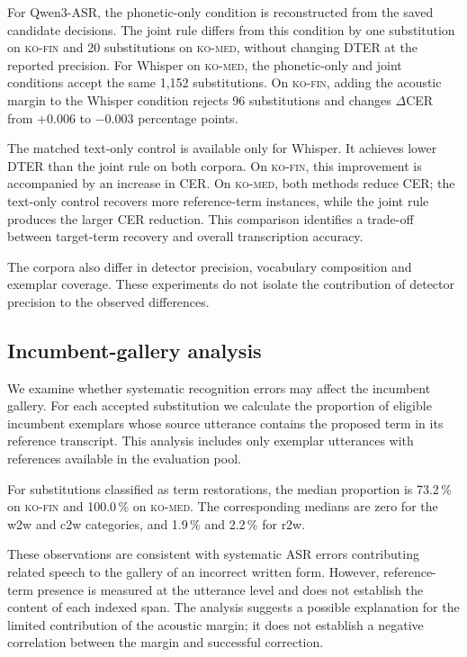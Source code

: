 \documentclass{article}
\newcommand{\corpA}{\textsc{ko-fin}}
\newcommand{\corpB}{\textsc{ko-med}}
\begin{document}
For Qwen3-ASR, the phonetic-only condition is reconstructed from the saved candidate decisions. The joint rule differs from this condition by one substitution on \corpA{} and 20 substitutions on \corpB{}, without changing DTER at the reported precision. For Whisper on \corpB{}, the phonetic-only and joint conditions accept the same 1{,}152 substitutions. On \corpA{}, adding the acoustic margin to the Whisper condition rejects 96 substitutions and changes $\Delta$CER from $+0.006$ to $-0.003$ percentage points.

The matched text-only control is available only for Whisper. It achieves lower DTER than  the joint rule on both corpora. On \corpA{}, this improvement is accompanied by an increase in CER. On \corpB{}, both methods reduce CER; the text-only control recovers more reference-term instances, while the joint rule produces the larger CER reduction. This comparison identifies a trade-off between target-term recovery and overall transcription accuracy.

The corpora also differ in detector precision, vocabulary composition and
exemplar coverage. These experiments do not isolate the contribution of detector
precision to the observed differences.

\subsection{Incumbent-gallery analysis}
\label{sec:incumbent}

We examine whether systematic recognition errors may affect the incumbent
gallery. For each accepted substitution we calculate the proportion of eligible
incumbent exemplars whose source utterance contains the proposed term in its
reference transcript. This analysis includes only exemplar utterances with
references available in the evaluation pool.

For substitutions classified as term restorations, the median proportion is
73.2\,\% on \corpA{} and 100.0\,\% on \corpB{}. The corresponding medians are
zero for the w2w and c2w categories, and 1.9\,\% and 2.2\,\% for r2w.

These observations are consistent with systematic ASR errors contributing
related speech to the gallery of an incorrect written form. However,
reference-term presence is measured at the utterance level and does not
establish the content of each indexed span. The analysis suggests a possible
explanation for the limited contribution of the acoustic margin; it does not
establish a negative correlation between the margin and successful correction.
\end{document}
